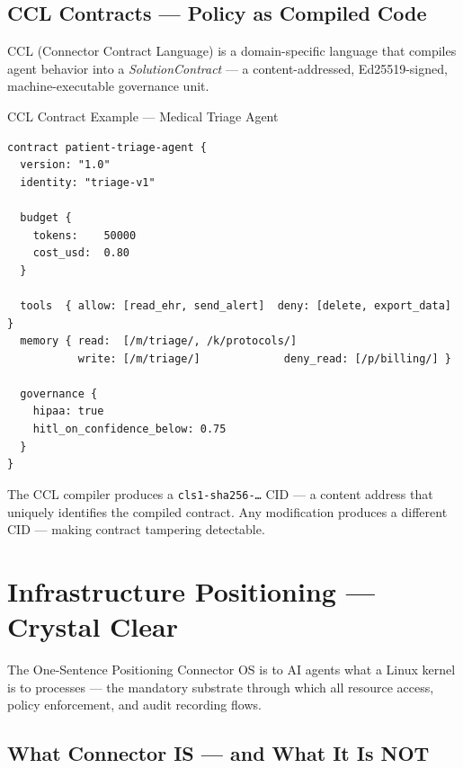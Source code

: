 \documentclass[11pt,a4paper]{article}
\begin{document}
\subsection{CCL Contracts — Policy as Compiled Code}

CCL (Connector Contract Language) is a domain-specific language that compiles agent behavior into a
\emph{SolutionContract} — a content-addressed, Ed25519-signed, machine-executable governance unit.

\begin{keybox}{CCL Contract Example — Medical Triage Agent}
\begin{verbatim}
contract patient-triage-agent {
  version: "1.0"
  identity: "triage-v1"
  
  budget {
    tokens:    50000
    cost_usd:  0.80
  }
  
  tools  { allow: [read_ehr, send_alert]  deny: [delete, export_data] }
  memory { read:  [/m/triage/, /k/protocols/]
           write: [/m/triage/]             deny_read: [/p/billing/] }
  
  governance {
    hipaa: true
    hitl_on_confidence_below: 0.75
  }
}
\end{verbatim}
\end{keybox}

The CCL compiler produces a \texttt{cls1-sha256-\ldots} CID — a content address that uniquely identifies
the compiled contract. Any modification produces a different CID — making contract tampering detectable.

\clearpage

\section{Infrastructure Positioning — Crystal Clear}
\label{sec:positioning}

\begin{insightbox}{The One-Sentence Positioning}
\large\centering
Connector OS is to AI agents what a Linux kernel is to processes — the mandatory substrate
through which all resource access, policy enforcement, and audit recording flows.
\end{insightbox}

\subsection{What Connector IS — and What It Is NOT}
\end{document}
